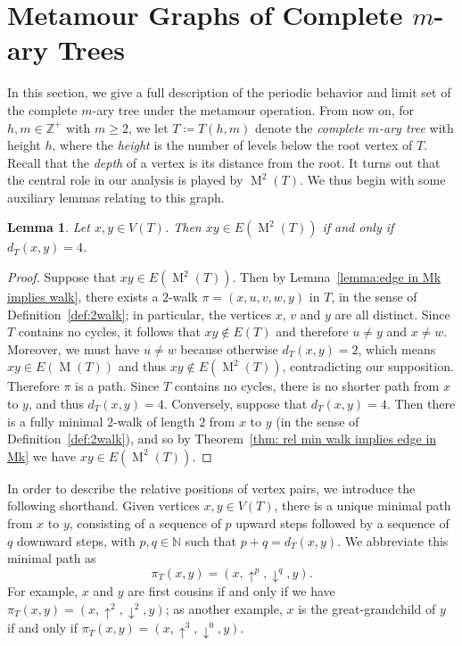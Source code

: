 \documentclass[12pt]{amsart}
\newtheorem{lemma}[theorem]{Lemma}
\theoremstyle{definition}
\theoremstyle{remark}
\numberwithin{equation}{section}
\numberwithin{figure}{section}
\newcommand{\M}{\operatorname{M}}
\newcommand{\N}{\mathbb{N}}
\newcommand{\Z}{\mathbb{Z}}
\begin{document}
\section{Metamour Graphs of Complete $m$-ary Trees}

In this section, we give a full description of the periodic behavior and limit set of the complete $m$-ary tree under the metamour operation.
From now on, for $h,m \in \Z^+$ with $m\ge 2$, we let $T \coloneqq T(h,m)$ denote the \emph{complete $m$-ary tree} with height $h$, where the \emph{height} is the number of levels below the root vertex of $T$.
Recall that the \emph{depth} of a vertex is its distance from the root.
It turns out that the central role in our analysis is played by $\M^2(T)$.
We thus begin with some auxiliary lemmas relating to this graph.

\begin{lemma}
    \label{lemma:M2 is d4}
    Let $x,y \in V(T)$.
    Then $xy \in E(\M^2(T))$ if and only if $d_T(x,y) = 4$.
\end{lemma}

\begin{proof}
    
    Suppose that $xy \in E(\M^2(T))$.
    Then by Lemma~\ref{lemma:edge in Mk implies walk}, there exists a $2$-walk $\pi = (x, u, v, w, y)$ in $T$, in the sense of Definition~\ref{def:2walk}; in particular, the vertices $x$, $v$ and $y$ are all distinct.
    Since $T$ contains no cycles, it follows that $xy \notin E(T)$ and therefore $u \neq y$ and $x \neq w$.
    Moreover, we must have $u \neq w$ because otherwise $d_T(x,y) = 2$, which means $xy \in E(\M(T))$ and thus $xy \notin E(\M^2(T))$, contradicting our supposition.
    Therefore $\pi$ is a path. Since $T$ contains no cycles, there is no shorter path from $x$ to $y$, and thus $d_T(x,y) = 4$.
    Conversely, suppose that $d_T(x,y) = 4$.
    Then there is a fully minimal $2$-walk of length $2$ from $x$ to $y$ (in the sense of Definition~\ref{def:2walk}), and so by Theorem~\ref{thm: rel min walk implies edge in Mk} we have $xy \in E(\M^2(T))$.
\end{proof}

In order to describe the relative positions of vertex pairs, we introduce the following shorthand.
Given vertices $x,y \in V(T)$,
there is a unique minimal path from $x$ to $y$, consisting of a sequence of $p$ upward steps followed by a sequence of $q$ downward steps, with $p,q \in \N$ such that $p+q = d_T(x,y)$.
We abbreviate this minimal path as
\begin{equation}
    \label{shorthand}
    \pi_T(x,y) = (x, \uparrow^p, \downarrow^q, y).
\end{equation}
For example, $x$ and $y$ are first cousins if and only if we have $\pi_T(x,y) = (x, \uparrow^2, \downarrow^2, y)$; as another example, $x$ is the great-grandchild of $y$ if and only if $\pi_T(x,y) = (x,\uparrow^3,\downarrow^0, y)$.
\end{document}

